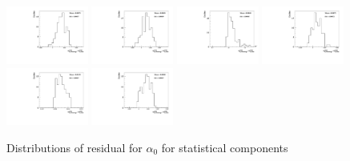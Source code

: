 \begin{figure}[h]
    \includegraphics[width=0.24\textwidth]{figure/polarimetery/syst/bootstrap/output_stat_4740_alpha0.pdf}
    \includegraphics[width=0.24\textwidth]{figure/polarimetery/syst/bootstrap/output_stat_4750_alpha0.pdf}
    \includegraphics[width=0.24\textwidth]{figure/polarimetery/syst/bootstrap/output_stat_4780_alpha0.pdf}
    \includegraphics[width=0.24\textwidth]{figure/polarimetery/syst/bootstrap/output_stat_4840_alpha0.pdf}
    \includegraphics[width=0.24\textwidth]{figure/polarimetery/syst/bootstrap/output_stat_4920_alpha0.pdf}
    \includegraphics[width=0.24\textwidth]{figure/polarimetery/syst/bootstrap/output_stat_4950_alpha0.pdf}
    \caption{Distributions of residual for $\alpha_0$ for statistical components}
\label{fig:angular_stat_alpha0}
\end{figure}

